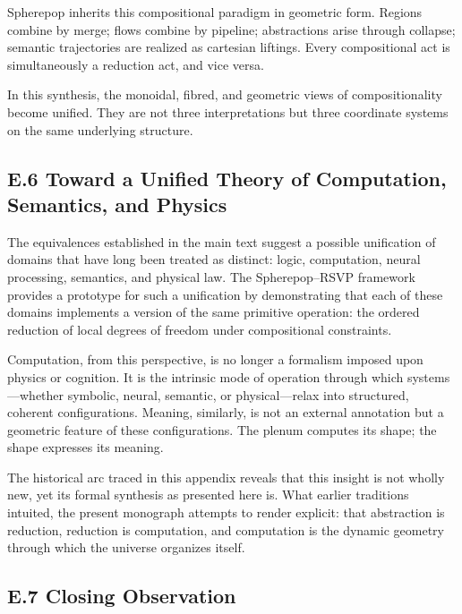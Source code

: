\documentclass[12pt,letterpaper]{article}
\begin{document}
Spherepop inherits this compositional paradigm in geometric form.  Regions 
combine by merge; flows combine by pipeline; abstractions arise through 
collapse; semantic trajectories are realized as cartesian liftings.  Every 
compositional act is simultaneously a reduction act, and vice versa.

In this synthesis, the monoidal, fibred, and geometric views of compositionality 
become unified.  They are not three interpretations but three coordinate systems 
on the same underlying structure.

\subsection*{E.6 Toward a Unified Theory of Computation, Semantics, and Physics}

The equivalences established in the main text suggest a possible unification of 
domains that have long been treated as distinct: logic, computation, neural 
processing, semantics, and physical law.  The Spherepop--RSVP framework provides 
a prototype for such a unification by demonstrating that each of these domains 
implements a version of the same primitive operation: the ordered reduction of 
local degrees of freedom under compositional constraints.

Computation, from this perspective, is no longer a formalism imposed upon 
physics or cognition.  It is the intrinsic mode of operation through which 
systems---whether symbolic, neural, semantic, or physical---relax into 
structured, coherent configurations.  Meaning, similarly, is not an external 
annotation but a geometric feature of these configurations.  The plenum computes 
its shape; the shape expresses its meaning.

The historical arc traced in this appendix reveals that this insight is not 
wholly new, yet its formal synthesis as presented here is.  What earlier 
traditions intuited, the present monograph attempts to render explicit: that 
abstraction is reduction, reduction is computation, and computation is the 
dynamic geometry through which the universe organizes itself.

\subsection*{E.7 Closing Observation}
\end{document}
